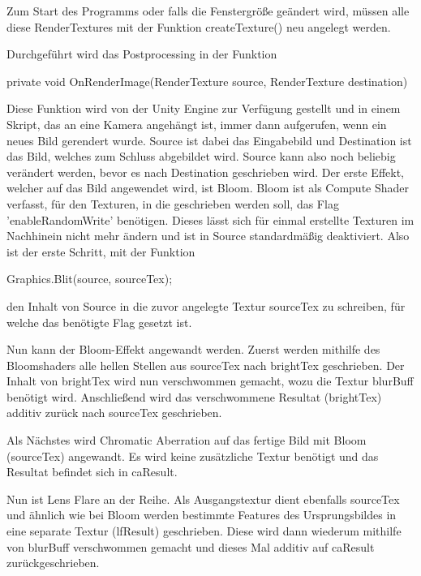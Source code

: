 Zum Start des Programms oder falls die Fenstergrö{\ss}e geändert wird, müssen alle diese RenderTextures mit der Funktion createTexture() neu angelegt werden.

Durchgeführt wird das Postprocessing in der Funktion 
\begin{csh} 
private void OnRenderImage(RenderTexture source, RenderTexture destination) 
\end{csh}
Diese Funktion wird von der Unity Engine zur Verfügung gestellt und in einem Skript, das an eine Kamera angehängt ist, immer dann aufgerufen, wenn ein neues Bild gerendert wurde. Source ist dabei das Eingabebild und Destination ist das Bild, welches zum Schluss abgebildet wird. Source kann also noch beliebig verändert werden, bevor es nach Destination geschrieben wird. Der erste Effekt, welcher auf das Bild angewendet wird, ist Bloom. Bloom ist als Compute Shader verfasst, für den Texturen, in die geschrieben werden soll, das Flag 'enableRandomWrite' benötigen. Dieses lässt sich für einmal erstellte Texturen im Nachhinein nicht mehr ändern und ist in Source standardmäßig deaktiviert. Also ist der erste Schritt, mit der Funktion 
\begin{csh}
Graphics.Blit(source, sourceTex);
\end{csh}
 den Inhalt von Source in die zuvor angelegte Textur sourceTex zu schreiben, für welche das benötigte Flag gesetzt ist.


Nun kann der Bloom-Effekt angewandt werden. Zuerst werden mithilfe des Bloomshaders alle hellen Stellen aus sourceTex nach brightTex geschrieben. Der Inhalt von brightTex wird nun verschwommen gemacht, wozu die Textur blurBuff benötigt wird. Anschlie{\ss}end wird das verschwommene Resultat (brightTex) additiv zurück nach sourceTex geschrieben.


Als Nächstes wird Chromatic Aberration auf das fertige Bild mit Bloom (sourceTex) angewandt. Es wird keine zusätzliche Textur benötigt und das Resultat befindet sich in caResult.


Nun ist Lens Flare an der Reihe. Als Ausgangstextur dient ebenfalls sourceTex und ähnlich wie bei Bloom werden bestimmte Features des Ursprungsbildes in eine separate Textur (lfResult) geschrieben. Diese wird dann wiederum mithilfe von blurBuff verschwommen gemacht und dieses Mal additiv auf caResult zurückgeschrieben. 


